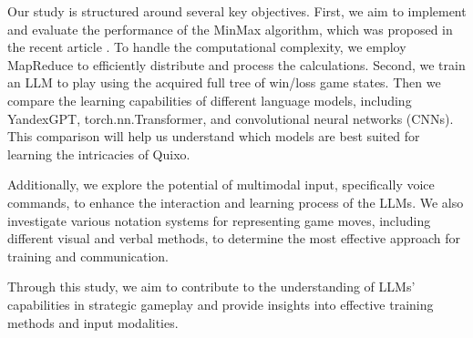 \documentclass[12pt, twoside]{article}
\begin{document}
Our study is structured around several key objectives.
 First, we aim to implement and evaluate the performance of the MinMax algorithm, which was proposed in the recent article \cite{tanak2020quixo}. 
 To handle the computational complexity, we employ MapReduce to efficiently distribute and process the calculations. Second, we train an LLM to play using the acquired full tree of win/loss game states.
Then we compare the learning capabilities of different language models, including YandexGPT, torch.nn.Transformer, and convolutional neural networks (CNNs). 
 This comparison will help us understand which models are best suited for learning the intricacies of Quixo.

Additionally, we explore the potential of multimodal input, specifically voice commands, to enhance the interaction and learning process of the LLMs. 
We also investigate various notation systems for representing game moves, including different visual and verbal methods, to determine the most effective approach for training and communication.

Through this study, we aim to contribute to the understanding of LLMs' capabilities in strategic gameplay and provide insights into effective training methods and input modalities.



\nocite{*}

\end{document}
